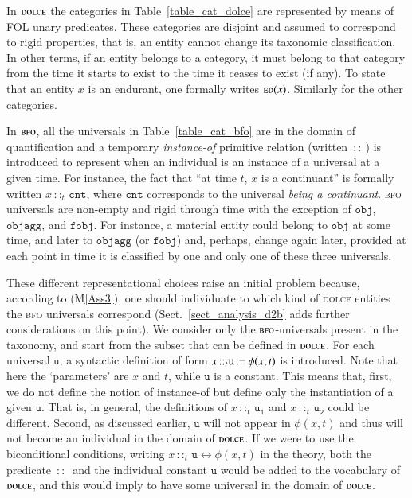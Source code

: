 \documentclass[ao]{iosart2x}
\newcommand{\nb}[1]{\textcolor{red}{$|$}\marginpar{\hspace*{-0cm}\parbox{20mm}{\scriptsize\raggedright\textcolor{red}{#1}}}}
\newcommand{\cn}[1]{\mathtt{#1}}
\newcommand{\ifif}{\leftrightarrow}
\newcommand\textequal{%
 \rule[.08ex]{5pt}{0.35pt}\llap{\rule[.78ex]{5pt}{0.35pt}}}
\newcommand{\sdef}{{\hspace{1.5pt}:\hspace{-2.5pt}\textequal\hspace{3pt}}}
\newcommand{\dolce}{{\textsc{dolce}}}
\newcommand{\bfo}{{\textsc{bfo}}}
\newcommand {\EDdcat} {\textsc{ed}}
\newcommand{\cntbcat}{\cn{cnt}}
\newcommand{\objbcat}{\cn{obj}}
\newcommand{\fobjbcat}{\cn{fobj}}
\newcommand{\objaggbcat}{\cn{objagg}}
\newcommand{\bfoiof}[1]{{\,::_{#1\:\!}}}
\begin{document}
In  {$\dolce$} the categories in  Table~\ref{table_cat_dolce} are represented by means of FOL unary predicates. These categories are disjoint and assumed to correspond to rigid properties, that is, an entity cannot change its taxonomic classification. In other terms, if an entity belongs to a category, it must belong to that category from the time it starts to exist to the time it ceases to exist (if any). To state that an entity $x$ is an endurant, one formally writes $\EDdcat(x)$. Similarly for the other categories.

In {$\bfo$}, all the universals in Table~\ref{table_cat_bfo} are in the domain of quantification and a temporary \emph{instance-of} primitive relation (written $\bfoiof{}$) is introduced to represent when %
an individual is an instance of a universal at a given time. For instance, the fact that ``at time $t$, $x$ is a continuant'' is formally written $x \bfoiof{t} \cntbcat$, where $\cntbcat$ corresponds to the universal \emph{being a continuant}.
{\bfo} universals are non-empty and rigid through time %
with the exception of $\objbcat$, $\objaggbcat$, and $\fobjbcat$. For instance, a material entity could belong to $\objbcat$ at some time, and later to $\objaggbcat$ (or $\fobjbcat$) and, perhaps, change again later, provided at each point in time it is classified by one and only one of these three universals.

These different representational choices raise an initial problem because, according to (M\ref{Ass3}), one should individuate to which kind of {\dolce} entities the {\bfo} universals correspond (Sect.~\ref{sect_analysis_d2b} adds further considerations on this point). 
We consider only 
the {$\bfo$}-universals present in the taxonomy, and start from the subset that can be defined in {$\dolce$}. 
For each universal $\cn{u}$, a syntactic definition of form $x \bfoiof{t} \cn{u} \sdef \phi(x,t)$ is introduced. Note that here the `parameters' are $x$ and $t$, while $\cn{u}$ is a constant. This means that, first, we do not define the notion of instance-of but 
define only the instantiation of a given $\cn{u}$. That is, in general, the definitions of $x \bfoiof{t} \cn{u_1}$ and  $x \bfoiof{t} \cn{u_2}$ could be different. 
Second, as discussed earlier, $\cn{u}$ will not appear in $\phi(x,t)$ and thus will not become an individual in the domain of {$\dolce$}. If we were to use the biconditional conditions, writing $x \bfoiof{t} \cn{u} \ifif \phi(x,t)$ in the theory, both the predicate $\bfoiof{}$ and the individual constant $\cn{u}$ would be added to the vocabulary of {$\dolce$}, and this would imply to have some universal in the domain of {$\dolce$}. 
\end{document}
